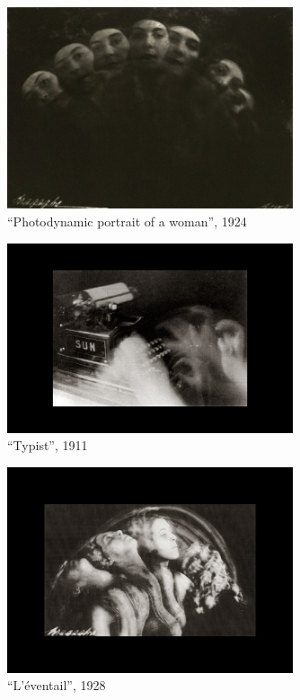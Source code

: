 \documentclass[
]{book}
\begin{document}
\begin{figure}
\centering
\includegraphics[width=0.75\textwidth,height=\textheight]{medias/corpus/bragaglia/Anton-Giulio-Bragaglia-fotodinamica-11.jpg}
\caption{``Photodynamic portrait of a woman'', 1924}
\end{figure}

\begin{figure}
\centering
\includegraphics[width=0.75\textwidth,height=\textheight]{medias/corpus/bragaglia/Anton-Giulio-Bragaglia-fotodinamica-12.jpg}
\caption{``Typist'', 1911}
\end{figure}

\begin{figure}
\centering
\includegraphics[width=0.75\textwidth,height=\textheight]{medias/corpus/bragaglia/Anton-Giulio-Bragaglia-fotodinamica-13.jpg}
\caption{``L'éventail'', 1928}
\end{figure}
\end{document}
